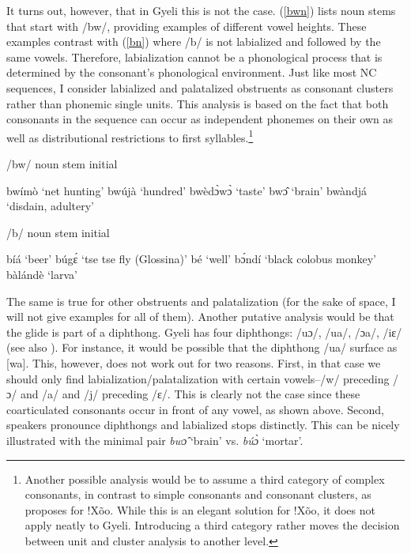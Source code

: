  It turns out, however, that in Gyeli this is not the case. (\ref{bwn}) lists noun stems that start with /bw/, providing examples of different vowel heights. These examples contrast with (\ref{bn}) where /b/ is not labialized and followed by the same vowels. Therefore, labialization cannot be a phonological process that is determined by the consonant's phonological environment. Just like most NC sequences, I consider labialized and palatalized obstruents as consonant clusters rather than phonemic single units. This analysis is based on the fact that both consonants in the sequence can occur as independent phonemes on their own as well as distributional restrictions to first syllables.\footnote{Another possible analysis would be to assume a third category of complex consonants, in contrast to simple consonants and consonant clusters, as \citet{guldemann2001} proposes for !Xõo. While this is an elegant solution for !Xõo, it does not apply neatly to Gyeli. Introducing a third category rather moves the decision between unit and cluster analysis to another level.}

\begin{exe} 
\ex\label{bwn} /bw/ noun stem initial
\begin{xlist}
\ex bwímò `net hunting'
\ex bwújà `hundred'
\ex bwèdɔ̀wɔ̀ `taste'
\ex bwɔ̂ `brain'
\ex bwàndjá `disdain, adultery'
\end{xlist}
\end{exe}

\begin{exe} 
\ex\label{bn} /b/ noun stem initial
\begin{xlist}
\ex bíá `beer'
\ex búgɛ́ `tse tse fly (Glossina)'
\ex bé `well'
\ex bɔ́ndí `black colobus monkey'
\ex bàlándè `larva'
\end{xlist}
\end{exe}

The same is true for other obstruents and palatalization (for the sake of space,  I will not give examples for all of them). Another putative analysis would be that the glide is part of a diphthong.  Gyeli has four diphthongs: /uɔ/, /ua/, /ɔa/, /iɛ/ (see also ). For instance, it would be possible that the diphthong /ua/ surface as [wa]. This, however, does not work out for two reasons. First, in that case we should only find labialization/palatalization with certain vowels--/w/ preceding /ɔ/ and /a/ and /j/ preceding /ɛ/. This is clearly not the case since these coarticulated consonants occur in front of any vowel, as shown above. Second, speakers pronounce diphthongs and labialized stops distinctly. This can be nicely illustrated with the minimal pair {\itshape bwɔ̂} `brain' vs. {\itshape búɔ̀} `mortar'.  



